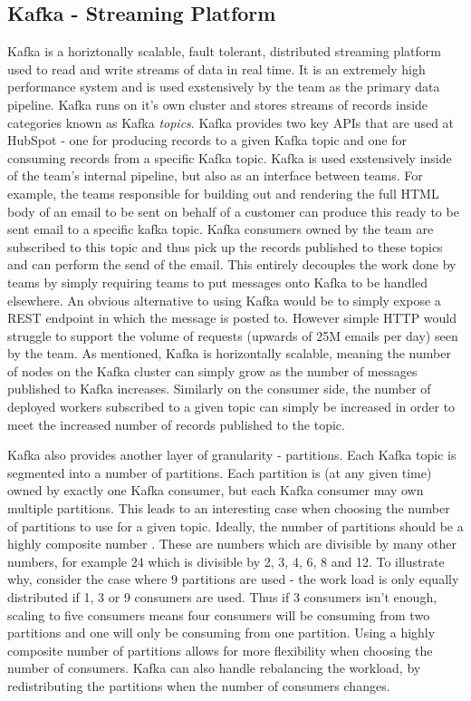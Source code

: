 \subsection{Kafka - Streaming Platform}
Kafka \cite{kafka} is a horiztonally scalable, fault tolerant, distributed streaming platform used to read and write streams of data in real time. It is an extremely high performance system and is used exstensively by the \team{} team as the primary data pipeline. Kafka runs on it's own cluster and stores streams of records inside categories known as Kafka \textit{topics}. Kafka provides two key APIs that are used at HubSpot - one for producing records to a given Kafka topic and one for consuming records from a specific Kafka topic. Kafka is used exstensively inside of the team's internal pipeline, but also as an interface between teams. For example, the teams responsible for building out and rendering the full HTML body of an email to be sent on behalf of a customer can produce this ready to be sent email to a specific kafka topic. Kafka consumers owned by the \team{} team are subscribed to this topic and thus pick up the records published to these topics and can perform the send of the email. This entirely decouples the work done by teams by simply requiring teams to put messages onto Kafka to be handled elsewhere. An obvious alternative to using Kafka would be to simply expose a REST endpoint in which the message is posted to. However simple HTTP would struggle to support the volume of requests (upwards of 25M emails per day) seen by the \team{} team. As mentioned, Kafka is horizontally scalable, meaning the number of nodes on the Kafka cluster can simply grow as the number of messages published to Kafka increases. Similarly on the consumer side, the number of deployed workers subscribed to a given topic can simply be increased in order to meet the increased number of records published to the topic.

Kafka also provides another layer of granularity - partitions. Each Kafka topic is segmented into a number of partitions. Each partition is (at any given time) owned by exactly one Kafka consumer, but each Kafka consumer may own multiple partitions. This leads to an interesting case when choosing the number of partitions to use for a given topic. Ideally, the number of partitions should be a highly composite number \cite {highlyCompositeNumbers}. These are numbers which are divisible by many other numbers, for example 24 which is divisible by 2, 3, 4, 6, 8 and 12. To illustrate why, consider the case where 9 partitions are used - the work load is only equally distributed if 1, 3 or 9 consumers are used. Thus if 3 consumers isn't enough, scaling to five consumers means four consumers will be consuming from two partitions and one will only be consuming from one partition. Using a highly composite number of partitions allows for more flexibility when choosing the number of consumers. Kafka can also handle rebalancing the workload, by redistributing the partitions when the number of consumers changes. 

